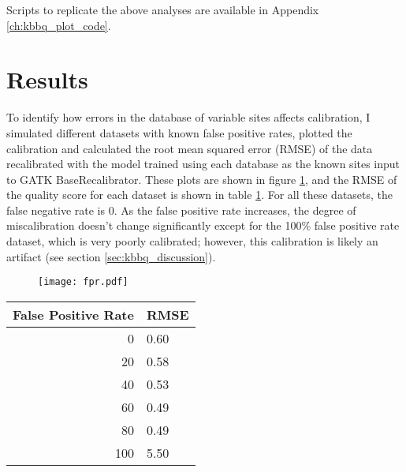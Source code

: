 Scripts to replicate the above analyses are available in Appendix \ref{ch:kbbq_plot_code}.

\section{Results}
To identify how errors in the database of variable sites affects calibration, I simulated different datasets with known false positive rates, plotted the calibration and calculated the root mean squared error (RMSE) of the data recalibrated with the model trained using each database as the known sites input to GATK BaseRecalibrator. These plots are shown in figure \ref{figure:fpr}, and the RMSE of the quality score for each dataset is shown in table \ref{table:fpr}. For all these datasets, the false negative rate is 0. As the false positive rate increases, the degree of miscalibration doesn't change significantly except for the 100\% false positive rate dataset, which is very poorly calibrated; however, this calibration is likely an artifact (see section \ref{sec:kbbq_discussion}).

\begin{figure}
\centering
	\texttt{[image: fpr.pdf]}
	\label{figure:fpr}
\end{figure}

\begin{table}
\centering
\begin{tabular}{r l}
\toprule
False Positive Rate & RMSE \\
\midrule
0 & 0.60 \\
20 & 0.58 \\
40 & 0.53 \\
60 & 0.49 \\
80 & 0.49 \\
100 & 5.50 \\
\bottomrule
\end{tabular}
\label{table:fpr}
\end{table}

